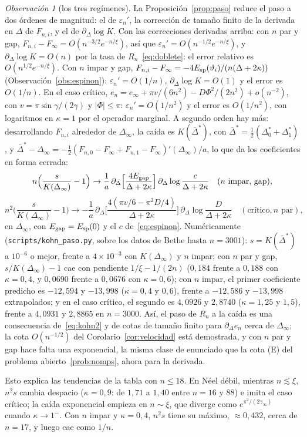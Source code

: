 \documentclass[11pt,a4paper]{article}
\theoremstyle{remark}
\newtheorem*{observacion}{Observación}
\begin{document}
\begin{observacion}[los tres regímenes]\label{obs:paso}
La Proposición~\ref{prop:paso} reduce el paso a dos órdenes de magnitud: el de $\varepsilon_n'$,
la corrección de tamaño finito de la derivada en $\Delta$ de $F_{n,i}$, y el de $\partial_\Delta\log K$.
Con las correcciones derivadas arriba: con $n$ par y gap, $F_{n,i}-F_\infty=O(n^{-3/2}e^{-n/\xi})$, así
que $\varepsilon_n'=O(n^{-1/2}e^{-n/\xi})$, y $\partial_\Delta\log K=O(n)$ por la tasa de
$R_n$~\eqref{eq:doblete}: el error relativo es $O(n^{1/2}e^{-n/\xi})$. Con $n$ impar y gap,
$F_{n,i}-F_\infty=-4E_{\rm sp}(\vartheta_i)/(n(\Delta+2\kappa))$ (Observación~\ref{obs:espinon}):
$\varepsilon_n'=O(1/n)$, $\partial_\Delta\log K=O(1)$ y el error es $O(1/n)$. En el caso crítico,
$e_n=e_\infty+\pi v/(6n^2)-D\Phi^2/(2n^2)+o(n^{-2})$, con $v=\pi\sin\gamma/(2\gamma)$ y $|\Phi|\le\pi$:
$\varepsilon_n'=O(1/n^2)$ y el error es $O(1/n^2)$, con logaritmos en $\kappa=1$ por el operador
marginal. A segundo orden hay más: desarrollando $F_{n,i}$ alrededor de $\Delta_\infty$, la caída es
$K(\bar\Delta^\ast)$, con $\bar\Delta^\ast=\tfrac12(\Delta^\ast_0+\Delta^\ast_1)$, y
$\bar\Delta^\ast-\Delta_\infty=-\tfrac12(F_{n,0}-F_\infty+F_{n,1}-F_\infty)'(\Delta_\infty)/a$, lo que da
los coeficientes en forma cerrada:
\[
  n\Big(\frac s{K(\Delta_\infty)}-1\Big)\to\frac1a\,\partial_\Delta\Big[\frac{4E_{\rm gap}}{\Delta+2\kappa}\Big]\,
  \partial_\Delta\log\frac c{\Delta+2\kappa}\quad(n\text{ impar, gap}),
\]
\[
  n^2\Big(\frac s{K(\Delta_\infty)}-1\Big)\to-\frac1a\,\partial_\Delta\Big[\frac{4(\pi v/6-\pi^2D/4)}{\Delta+2\kappa}\Big]\,
  \partial_\Delta\log\frac D{\Delta+2\kappa}\quad(\text{crítico}, n\text{ par}),
\]
en $\Delta_\infty$, con $E_{\rm gap}=E_{\rm sp}(0)$ y el $c$ de~\eqref{eq:espinon}. Numéricamente
(\texttt{scripts/kohn\_paso.py}, sobre los datos de Bethe hasta $n=3001$): $s=K(\bar\Delta^\ast)$ a
$10^{-6}$ o mejor, frente a $4\times10^{-3}$ con $K(\Delta_\infty)$ y $n$ impar; con $n$ par y gap,
$s/K(\Delta_\infty)-1$ cae con pendiente $1/\xi-1/(2n)$ ($0{,}184$ frente a $0{,}188$ con
$\kappa=0{,}4$, y $0{,}0690$ frente a $0{,}0676$ con $\kappa=0{,}6$); con $n$ impar, el primer
coeficiente predicho es $-12{,}594$ y $-13{,}998$ ($\kappa=0{,}4$ y $0{,}6$), frente a $-12{,}586$ y
$-13{,}998$ extrapolados; y en el caso crítico, el segundo es $4{,}0926$ y $2{,}8740$
($\kappa=1{,}25$ y $1{,}5$), frente a $4{,}0931$ y $2{,}8865$ en $n=3000$. Así, el paso de $R_n$ a la caída
es una consecuencia de~\eqref{eq:kohn2} y de cotas de tamaño finito para $\partial_\Delta e_n$ cerca
de $\Delta_\infty$; la cota $O(n^{-1/2})$ del Corolario~\ref{cor:velocidad} está demostrada, y con $n$
par y gap hace falta una exponencial, la misma clase de enunciado que la cota (E) del problema
abierto~\ref{prob:nomps}, ahora para la derivada.
\end{observacion}
Esto explica las tendencias de la tabla con $n\le18$. En Néel débil, mientras $n\lesssim\xi$,
$n^2s$ cambia despacio ($\kappa=0{,}9$: de $1{,}71$ a $1{,}40$ entre $n=16$ y $88$) e imita el caso
crítico; la caída exponencial empieza en $n\sim\xi$, que diverge como $e^{\pi^2/(2\gamma_\infty)}$
cuando $\kappa\to1^-$. Con $n$ impar y $\kappa=0{,}4$, $n^2s$ tiene su máximo, $\approx0{,}432$, cerca
de $n=17$, y luego cae como $1/n$.
\end{document}
